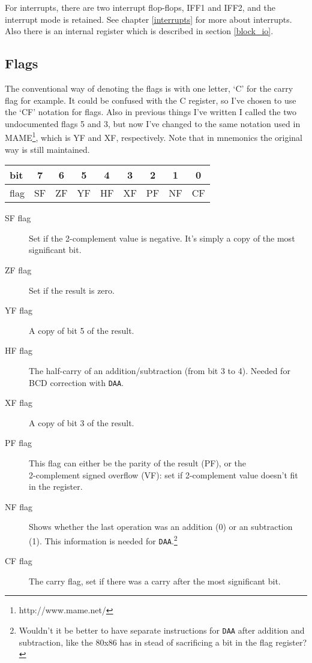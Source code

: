 \documentclass[12pt,twoside,openright,a4paper]{book}
\newcommand{\instrt}{\rule{0pt}{2.5ex}}
\newcommand{\instrb}{\rule[-1.4ex]{0pt}{0pt}}
\begin{document}
For interrupts, there are two interrupt flop-flops, IFF1 and IFF2, and the interrupt mode is retained. See chapter \ref{interrupts} for more about interrupts. Also there is an internal register which is described in section \ref{block_io}.


\subsection{Flags}
\label{flags}

The conventional way of denoting the flags is with one letter, `C' for the carry flag for example. It could be confused with the C register, so I've chosen to use the `CF' notation for flags. Also in previous things I've written I called the two undocumented flags 5 and 3, but now I've changed to the same notation used in MAME\footnote{http://www.mame.net/}, which is YF and XF, respectively. Note that in mnemonics the original way is still maintained.

\pagebreak
\begin{tabular}{|l|c|c|c|c|c|c|c|c|} 
	\hline
	bit & 7 & 6 & 5 & 4 & 3 & 2 & 1 & 0 \instrt\instrb \\
	\hline
	flag & SF & ZF & YF & HF & XF & PF & NF & CF \instrt\instrb \\ 
	\hline
\end{tabular}

\begin{description}

	\item[SF flag]
	Set if the 2-complement value is negative. It's simply a copy of the most significant bit.

	\item[ZF flag]
	Set if the result is zero.

	\item[YF flag]
	A copy of bit 5 of the result.

	\item[HF flag]
	The half-carry of an addition/subtraction (from bit 3 to 4). Needed for BCD correction with {\tt DAA}.

	\item[XF flag]
	A copy of bit 3 of the result.

	\item[PF flag]
	This flag can either be the parity of the result (PF), or the \\ 2-complement signed overflow (VF): set if 2-complement value doesn't fit in the register.

	\item[NF flag]
	Shows whether the last operation was an addition (0) or an subtraction (1). This information is needed for {\tt DAA}.\footnote{Wouldn't it be better to have separate instructions for {\tt DAA} after addition and subtraction, like the 80x86 has in stead of sacrificing a bit in the flag register?}

	\item[CF flag]
	The carry flag, set if there was a carry after the most significant bit.

\end{description}
\end{document}
